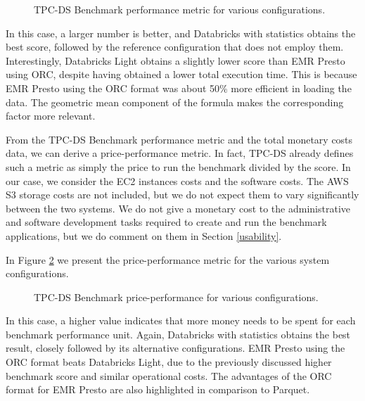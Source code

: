 \begin{figure}
   \begin{center}
   \end{center}
   \caption{TPC-DS Benchmark performance metric for various configurations.}
   \label{fig:performanceMetricResults}
\end{figure}

In this case, a larger number is better, and Databricks with statistics obtains the best score, followed by the reference configuration that does not employ them. Interestingly, Databricks Light obtains a slightly lower score than EMR Presto using ORC, despite having obtained a lower total execution time. This is because EMR Presto using the ORC format was about 50\% more efficient in loading the data. The geometric mean component of the formula makes the corresponding factor more relevant.

From the TPC-DS Benchmark performance metric and the total monetary costs data, we can derive a price-performance metric. In fact, TPC-DS already defines such a metric as simply the price to run the benchmark divided by the score. In our case, we consider the EC2 instances costs and the software costs. The AWS S3 storage costs are not included, but we do not expect them to vary significantly between the two systems. We do not give a monetary cost to the administrative and software development tasks required to create and run the benchmark applications, but we do comment on them in Section \ref{usability}.

In Figure \ref{fig:pricePerformanceResults} we present the price-performance metric for the various system configurations.

\begin{figure}
   \begin{center}
   \end{center}
   \caption{TPC-DS Benchmark price-performance for various configurations.}
   \label{fig:pricePerformanceResults}
\end{figure}

In this case, a higher value indicates that more money needs to be spent for each benchmark performance unit. Again, Databricks with statistics obtains the best result, closely followed by its alternative configurations. EMR Presto using the ORC format beats Databricks Light, due to the previously discussed higher benchmark score and similar operational costs. The advantages of the ORC format for EMR Presto are also highlighted in comparison to Parquet.




